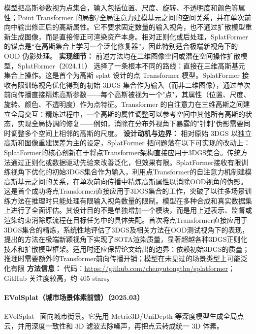 模型把高斯参数视为点集合，输入包括位置、尺度、旋转、不透明度和颜色等属性；Point Transformer 的局部/全局注意力建模基元之间的空间关系，并在单次前向中输出修正后的高斯属性。它不要求固定数量的输入视角，也不通过扩散模型重新生成图像，而是直接修正可渲染资产本身。相对正则化或后处理，SplatFormer 的锚点是“在高斯集合上学习一个泛化修复器”，因此特别适合极端新视角下的 OOD 伪影处理。
\textbf{实现细节：} 前述方法均在二维图像空间或潜在空间操作扩散模型，SplatFormer（2024.11） 选择了一条根本不同的路线：直接在三维高斯基元集合上操作。这是首个为高斯 splat 设计的点 Transformer 模型。SplatFormer 接收有限训练视角优化得到的初始 3DGS 集合作为输入（而非二维图像），通过单次前向传播直接精炼高斯参数——每个高斯被视为一个"点"，其属性（位置、尺度、旋转、颜色、不透明度）作为点特征。Transformer 的自注意力在三维高斯之间建立全局交互：精炼过程中，一个高斯的属性调整可以参考空间中其他所有高斯的状态，实现全局协调的修复——例如，消除在分布外视角下暴露的"针刺"伪影需要同时调整多个空间上相邻的高斯的尺度。
\textbf{设计动机与边界：} 相对原始 3DGS 以独立高斯和图像重建误差为主的设定，SplatFormer 把问题落在以下可实现的改动上：SplatFormer的核心创新在于将点Transformer架构直接应用于3DGS集合。传统方法通过正则化或数据驱动先验来改善泛化，但效果有限。SplatFormer接收有限训练视角下优化的初始3DGS集合作为输入，利用点Transformer的自注意力机制建模高斯基元之间的关系，在单次前向传播中精炼高斯属性以消除OOD视角的伪影。这是首个成功将点Transformer直接应用于3DGS集合的工作，突破了以往多场景训练方法在推理时只能处理有限输入视角数量的限制。模型在多种合成和真实数据集上进行了全面评估。其设计目的不是单独增加一个模块，而是用上述表示、监督或渲染约束消除原流程在目标任务中的具体失配。首次将点Transformer直接应用于3DGS集合的精炼，系统性地评估了3DGS及相关方法在OOD测试视角下的表现，提出的方法在极端新颖视角下实现了SOTA渲染质量，显著超越各种3DGS正则化技术和扩散模型框架。适用时还应保留论文给出的边界：依赖初始3DGS的质量；推理时需要额外的Transformer前向传播开销；模型在未见过的场景类型上可能泛化有限
\textbf{方法信息：} 代码：\url{https://github.com/chenyutongthu/splatformer}；GitHub 关注度较高，约 405 stars。



\paragraph{EVolSplat（城市场景体素前馈）（2025.03）}
EVolSplat~\cite{2503_20168} 面向城市街景。它先用 Metric3D/UniDepth 等深度模型生成全局点云，并用深度一致性和 3D 滤波去除噪声，再把点云转成统一 3D 体素。

